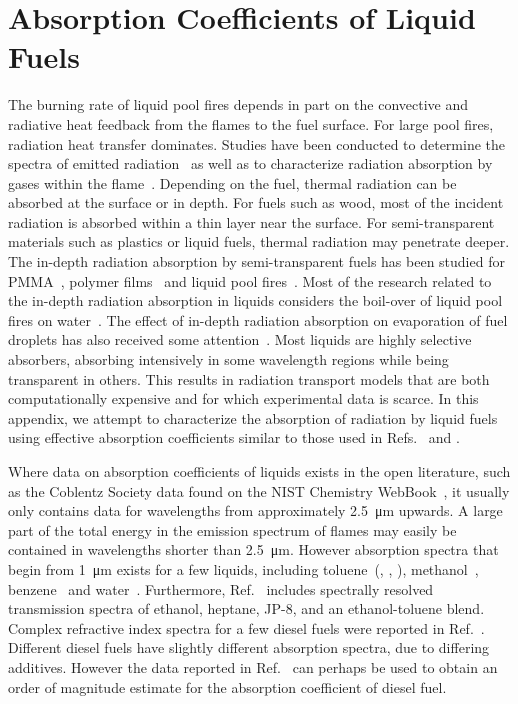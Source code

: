 \chapter{Absorption Coefficients of Liquid Fuels}
\label{app_abscoeff}

The burning rate of liquid pool fires depends in part on the convective and radiative heat feedback from the flames to the fuel
surface. For large pool fires, radiation heat transfer dominates. Studies have been conducted to determine the spectra of emitted
radiation~\cite{Suo-Anttila:PCT2009} as well as to characterize radiation absorption by gases within the
flame~\cite{Wakatsuki:CST2008}. Depending on the fuel, thermal radiation can be absorbed at the surface or in depth. For fuels
such as wood, most of the incident radiation is absorbed within a thin layer near the surface. For semi-transparent materials such
as plastics or liquid fuels, thermal radiation may penetrate deeper. The in-depth radiation absorption by semi-transparent fuels
has been studied for PMMA~\cite{Stoliarov:CF2009}, polymer films~\cite{Tsilingiris:ECM2003} and liquid pool
fires~\cite{Suo-Anttila:PCT2009}. Most of the research related to the in-depth radiation absorption in liquids considers the
boil-over of liquid pool fires on water~\cite{Broeckmann:JLPPI1995}. The effect of in-depth radiation absorption on evaporation of
fuel droplets has also received some attention~\cite{Sazhin:IJHMT2004b}. Most liquids are highly selective absorbers, absorbing
intensively in some wavelength regions while being transparent in others. This results in radiation transport models that are both
computationally expensive and for which experimental data is scarce. In this appendix, we attempt to characterize the absorption
of radiation by liquid fuels using effective absorption coefficients similar to those used in Refs.~\cite{Madhav:IJMP1995} and
\cite{Manohar:JHT1995}.

Where data on absorption coefficients of liquids exists in the open literature, such as the Coblentz Society data found on the
NIST Chemistry WebBook~\cite{Coblentz:1}, it usually  only contains data for wavelengths from approximately \SI{2.5}{\micro m}
upwards. A large part of the total energy in the emission spectrum of flames may easily be contained in wavelengths shorter than
\SI{2.5}{\micro m}. However absorption spectra that begin from \SI{1}{\micro m} exists for a few liquids, including
toluene~(\cite{Bertie:JMS2005}, \cite{Bertie:AS1994b}, \cite{Bertie:AS1994a}), methanol~\cite{Bertie:AS1993a},
benzene~\cite{Bertie:AS1993b} and water~\cite{Bertie:AS1996}. Furthermore, Ref.~\cite{Suo-Anttila:PCT2009} includes spectrally
resolved transmission spectra of ethanol, heptane, JP-8, and an ethanol-toluene blend. Complex refractive index spectra for a few
diesel fuels were reported in Ref.~\cite{Sazhin:IJHMT2004b}. Different diesel fuels have slightly different absorption spectra,
due to differing additives. However the data reported in Ref.~\cite{Sazhin:IJHMT2004b} can perhaps be used to obtain an order of
magnitude estimate for the absorption coefficient of diesel fuel.

